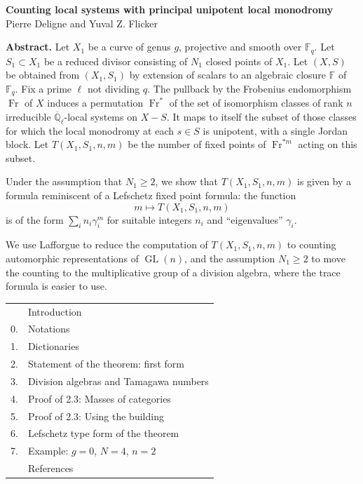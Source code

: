 \documentclass[10pt]{article}
\newcommand{\Fq}{\mathbb F_q}
\newcommand{\Fb}{\mathbb F}
\newcommand{\Ql}{\overline{\mathbb Q}_{\ell}}
\newcommand{\GL}{\operatorname{GL}}
\newcommand{\Fr}{\operatorname{Fr}}
\theoremstyle{deligne}
\begin{document}
\begin{center}
{\Large\bfseries Counting local systems with principal unipotent local monodromy}\\[0.35em]
{\large Pierre Deligne and Yuval Z. Flicker}
\end{center}

\textbf{Abstract.} Let $X_1$ be a curve of genus $g$, projective and smooth over $\Fq$. Let $S_1\subset X_1$ be a reduced divisor consisting of $N_1$ closed points of $X_1$. Let $(X,S)$ be obtained from $(X_1,S_1)$ by extension of scalars to an algebraic closure $\Fb$ of $\Fq$. Fix a prime $\ell$ not dividing $q$. The pullback by the Frobenius endomorphism $\Fr$ of $X$ induces a permutation $\Fr^*$ of the set of isomorphism classes of rank $n$ irreducible $\Ql$-local systems on $X-S$. It maps to itself the subset of those classes for which the local monodromy at each $s\in S$ is unipotent, with a single Jordan block. Let $T(X_1,S_1,n,m)$ be the number of fixed points of $\Fr^{*m}$ acting on this subset.

Under the assumption that $N_1\ge2$, we show that $T(X_1,S_1,n,m)$ is given by a formula reminiscent of a Lefschetz fixed point formula: the function
\[
 m\longmapsto T(X_1,S_1,n,m)
\]
is of the form $\sum_i n_i\gamma_i^m$ for suitable integers $n_i$ and ``eigenvalues'' $\gamma_i$.

We use Lafforgue to reduce the computation of $T(X_1,S_1,n,m)$ to counting automorphic representations of $\GL(n)$, and the assumption $N_1\ge2$ to move the counting to the multiplicative group of a division algebra, where the trace formula is easier to use.

\begin{center}
\begin{tabular}{rl}
& Introduction\\
0. & Notations\\
1. & Dictionaries\\
2. & Statement of the theorem: first form\\
3. & Division algebras and Tamagawa numbers\\
4. & Proof of 2.3: Masses of categories\\
5. & Proof of 2.3: Using the building\\
6. & Lefschetz type form of the theorem\\
7. & Example: $g=0$, $N=4$, $n=2$\\
& References
\end{tabular}
\end{center}
\end{document}
